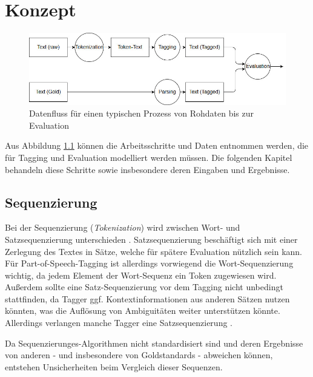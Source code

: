 %
\chapter{Konzept}
\label{sec:concept}



\begin{figure}[htb]
	\includegraphics[width=\textwidth]{gfx/Dataflow_concept.jpg}
	\caption{Datenfluss für einen typischen Prozess von Rohdaten bis zur Evaluation}
	\label{fig:concept:overview}
\end{figure}

Aus Abbildung \ref{fig:concept:overview} können die Arbeitsschritte und Daten entnommen werden, die für Tagging und Evaluation modelliert werden müssen. Die folgenden Kapitel behandeln diese Schritte sowie insbesondere deren Eingaben und Ergebnisse.

\section{Sequenzierung}
\label{sec:concept:sequence}
Bei der Sequenzierung (\textit{Tokenization}) wird zwischen Wort- und Satzsequenzierung unterschieden \cite{Smith}. Satzsequenzierung beschäftigt sich mit einer Zerlegung des Textes in Sätze, welche für spätere Evaluation nützlich sein kann. Für Part-of-Speech-Tagging ist allerdings vorwiegend die Wort-Sequenzierung wichtig, da jedem Element der Wort-Sequenz ein Token zugewiesen wird. Außerdem sollte eine Satz-Sequenzierung vor dem Tagging nicht unbedingt stattfinden, da Tagger ggf. Kontextinformationen aus anderen Sätzen nutzen könnten, was die Auflösung von Ambiguitäten weiter unterstützen könnte. Allerdings verlangen manche Tagger eine Satzsequenzierung \cite{paroubek}.

Da Sequenzierunges-Algorithmen nicht standardisiert sind \cite{paroubek} und deren Ergebnisse von anderen - und insbesondere von Goldstandards - abweichen können, entstehen Unsicherheiten beim Vergleich dieser Sequenzen. 

